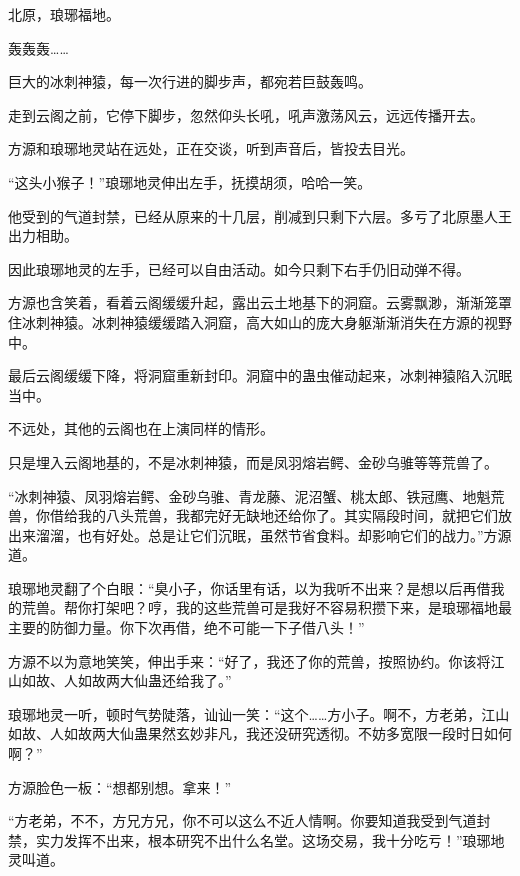 
\begin{this_body}



北原，琅琊福地。

轰轰轰……

巨大的冰刺神猿，每一次行进的脚步声，都宛若巨鼓轰鸣。

走到云阁之前，它停下脚步，忽然仰头长吼，吼声激荡风云，远远传播开去。

方源和琅琊地灵站在远处，正在交谈，听到声音后，皆投去目光。

“这头小猴子！”琅琊地灵伸出左手，抚摸胡须，哈哈一笑。

他受到的气道封禁，已经从原来的十几层，削减到只剩下六层。多亏了北原墨人王出力相助。

因此琅琊地灵的左手，已经可以自由活动。如今只剩下右手仍旧动弹不得。

方源也含笑着，看着云阁缓缓升起，露出云土地基下的洞窟。云雾飘渺，渐渐笼罩住冰刺神猿。冰刺神猿缓缓踏入洞窟，高大如山的庞大身躯渐渐消失在方源的视野中。

最后云阁缓缓下降，将洞窟重新封印。洞窟中的蛊虫催动起来，冰刺神猿陷入沉眠当中。

不远处，其他的云阁也在上演同样的情形。

只是埋入云阁地基的，不是冰刺神猿，而是凤羽熔岩鳄、金砂乌骓等等荒兽了。

“冰刺神猿、凤羽熔岩鳄、金砂乌骓、青龙藤、泥沼蟹、桃太郎、铁冠鹰、地魁荒兽，你借给我的八头荒兽，我都完好无缺地还给你了。其实隔段时间，就把它们放出来溜溜，也有好处。总是让它们沉眠，虽然节省食料。却影响它们的战力。”方源道。

琅琊地灵翻了个白眼：“臭小子，你话里有话，以为我听不出来？是想以后再借我的荒兽。帮你打架吧？哼，我的这些荒兽可是我好不容易积攒下来，是琅琊福地最主要的防御力量。你下次再借，绝不可能一下子借八头！”

方源不以为意地笑笑，伸出手来：“好了，我还了你的荒兽，按照协约。你该将江山如故、人如故两大仙蛊还给我了。”

琅琊地灵一听，顿时气势陡落，讪讪一笑：“这个……方小子。啊不，方老弟，江山如故、人如故两大仙蛊果然玄妙非凡，我还没研究透彻。不妨多宽限一段时日如何啊？”

方源脸色一板：“想都别想。拿来！”

“方老弟，不不，方兄方兄，你不可以这么不近人情啊。你要知道我受到气道封禁，实力发挥不出来，根本研究不出什么名堂。这场交易，我十分吃亏！”琅琊地灵叫道。


\end{this_body}
